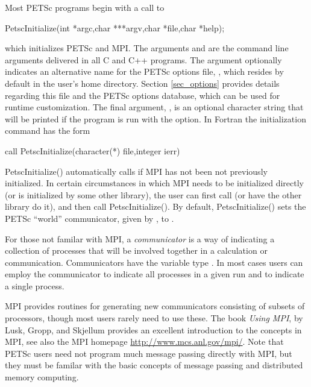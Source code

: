 Most PETSc programs begin with a call to 
\begin{tabbing}
  PetscInitialize(int *argc,char ***argv,char *file,char *help);
\end{tabbing} 
which initializes PETSc and MPI.  The arguments  and 
 are the command line arguments delivered in all C and C++
programs.  The argument 
optionally indicates an alternative name for the PETSc options file,
, which resides by default in the user's home directory.
Section \ref{sec_options} provides details regarding
this file and the PETSc options database, which can be used for runtime
customization. The final argument, , is an optional
character string that will be printed if the program is run with the
 option.  In Fortran the initialization command has the form
\begin{tabbing}
   call PetscInitialize(character(*) file,integer ierr)
\end{tabbing} 
PetscInitialize() automatically calls  if MPI
has not been not previously initialized. In certain 
circumstances in which MPI needs to be initialized directly (or is
initialized by some other library), the user can first call 
 (or have the other library do it), and then call
PetscInitialize().
By default, PetscInitialize() sets the PETSc ``world''
communicator, given by , to .

For those not familar with MPI, a {\em communicator} is a way of
indicating a collection of processes that will be involved together
in a calculation or communication. Communicators have the variable type
. In most cases users can employ the communicator  to indicate all processes in a given run and  to indicate a single process.

MPI provides routines
for generating new communicators consisting of subsets of processors,
though most users rarely need to use these. The book {\em Using MPI},
by Lusk, Gropp, and Skjellum \cite{using-mpi} provides an excellent
introduction to the concepts in MPI, see also the MPI homepage 
\href{http://www.mcs.anl.gov/mpi/}{http://www.mcs.anl.gov/mpi/}.
Note that PETSc users need not program much message passing directly
with MPI, but they must be familar with the basic concepts of message
passing and distributed memory computing.


